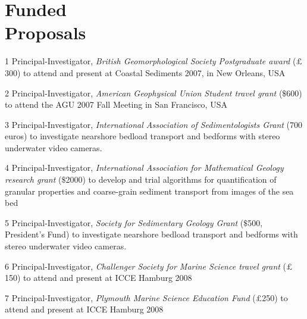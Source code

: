 \documentclass[margin,line]{resume}
\begin{document}
\begin{resume}
\begin{footnotesize}
\begin{list1}
	\end{list1}
        \end{footnotesize}

    \section{\mysidestyle Funded \\ Proposals}
        \begin{footnotesize}
	\begin{list1}
	\item[1] Principal-Investigator, {\sl British Geomorphological Society Postgraduate award} ($\pounds$300) to attend and present at Coastal Sediments 2007, in New Orleans, USA\\
	
	\item[2] Principal-Investigator, {\sl American Geophysical Union Student travel grant} ($\$$600) to attend the AGU 2007 Fall Meeting in San Francisco, USA\\
	
	\item[3] Principal-Investigator, {\sl International Association of Sedimentologists Grant} (700 euros) to investigate nearshore bedload transport and bedforms with stereo underwater video cameras.\\
	
	\item[4] Principal-Investigator, {\sl International Association for Mathematical Geology research grant} ($\$$2000) to develop and trial algorithms for quantification of granular properties and coarse-grain sediment transport from images of the sea bed\\
	
	\item[5] Principal-Investigator, {\sl Society for Sedimentary Geology Grant} ($\$$500, President's Fund) to investigate nearshore bedload transport and bedforms with stereo underwater video cameras.\\
	
	\item[6] Principal-Investigator, {\sl Challenger Society for Marine Science travel grant} ($\pounds$150) to attend and present at ICCE Hamburg 2008\\
	
	\item[7] Principal-Investigator, {\sl Plymouth Marine Science Education Fund} ($\pounds$250) to attend and present at ICCE Hamburg 2008\\


\end{list1}
\end{footnotesize}
\end{resume}
\end{document}
